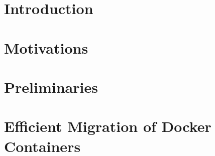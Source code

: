 \documentclass[sigconf]{acmart}
\begin{document}


\begin{abstract}

\end{abstract}






\maketitle

% 

% 

\section{Introduction}


\section{Motivations}



% 

\section{Preliminaries}



\section{Efficient  Migration of Docker Containers}



\end{document}
